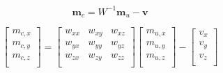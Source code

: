 \begin{equation}
    \label{eq:magnetometer}
    \pmb{m}_c = W^{-1} \pmb{m}_u - \pmb{v}
\end{equation}

\begin{equation}
\label{eq:magnetometerExpanded}
    \begin{bmatrix}
        m_{c,x}\\
        m_{c,y}\\
        m_{c,z}\\
    \end{bmatrix}
    =
    \begin{bmatrix}
        w_{xx} & w_{xy} & w_{xz}\\
        w_{yx} & w_{yy} & w_{yz}\\
        w_{zx} & w_{zy} & w_{zz}\\
    \end{bmatrix}
    \begin{bmatrix}
        m_{u,x}\\
        m_{u,y}\\
        m_{u,z}\\
    \end{bmatrix}
    -
    \begin{bmatrix}
        v_{x}\\
        v_{y}\\
        v_{z}\\
    \end{bmatrix}
\end{equation}
